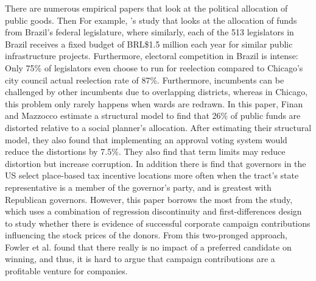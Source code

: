 There are numerous empirical papers that look at the political allocation of public goods.
Then For example, \cite{finan2021electoral}'s study that looks at the allocation of funds from Brazil's federal legislature, where similarly, each of the 513 legislators in Brazil receives a fixed budget of BRL\$1.5 million each year for similar public infrastructure projects.  
Furthermore, electoral competition in Brazil is intense: Only 75\% of legislators even choose to run for reelection compared to Chicago's city council actual reelection rate of 87\%.
Furthermore, incumbents can be challenged by other incumbents due to overlapping districts, whereas in Chicago, this problem only rarely happens when wards are redrawn.
In this paper, Finan and Mazzocco estimate a structural model to find that 26\% of public funds are distorted relative to a social planner's allocation. 
After estimating their structural model, they also found that implementing an approval voting system would reduce the distortions by 7.5\%. 
They also find that term limits may reduce distortion but increase corruption.
In addition there is \cite{frank_hoopes_lester_2022} find that governors in the US select place-based tax incentive locations more often when the tract's state representative is a member of the governor's party, and is greatest with Republican governors.
However, this paper borrows the most from the \cite{fowleretalquidproquo} study, which uses a combination of regression discontinuity and first-differences design to study whether there is evidence of successful corporate campaign contributions influencing the stock prices of the donors. 
From this two-pronged approach, Fowler et al. found that there really is no impact of a preferred candidate on winning, and thus, it is hard to argue that campaign contributions are a profitable venture for companies. 

